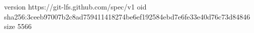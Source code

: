 version https://git-lfs.github.com/spec/v1
oid sha256:3ceeb97007b2c8ad759411418274be6ef192584ebd7e6fe33e40d76c73d84846
size 5566
